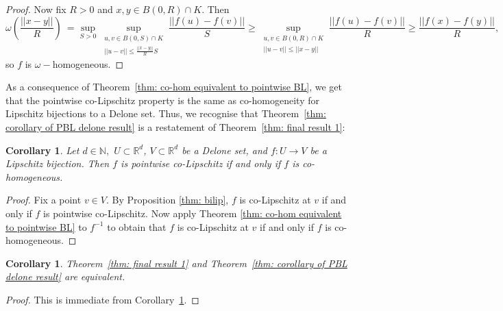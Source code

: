 \documentclass{article}
\newtheorem{cor}[define]{Corollary}
\newcommand{\R}{\mathbb{R}}
\newcommand{\N}{\mathbb{N}}
\begin{document}
\begin{proof}
   Now fix $R>0$ and $x,y \in B(0,R)\cap K.$ Then
    \begin{equation*}
        \omega\left(\frac{||x-y||}{R}\right) \ = \sup_{S>0} \sup_{\substack{u,v \in B(0,S)\cap K\\||u-v|| \leq \frac{||x-y||}{R}S}} \frac{||f(u)-f(v)||}{S} \geq \sup_{\substack{u,v \in B(0,R)\cap K\\||u-v|| \leq ||x-y||}} \frac{||f(u)-f(v)||}{R}\geq \frac{||f(x)-f(y)||}{R},
    \end{equation*} so $f$ is $\omega-$homogeneous.
\end{proof}
As a consequence of Theorem~\ref{thm: co-hom equivalent to pointwise BL}, we get that the pointwise co-Lipschitz property is the same as co-homogeneity for Lipschitz bijections to a Delone set. Thus, we recognise that Theorem~\ref{thm: corollary of PBL delone result} is a restatement of Theorem~\ref{thm: final result 1}:
\begin{cor} \label{cor: cohom equivalence}
    Let $d \in \N,$ $U \subset \R^d$, $V \subset \R^d$ be a Delone set, and $f:U \to V$ be a Lipschitz bijection. Then $f$ is pointwise co-Lipschitz if and only if $f$ is co-homogeneous. 
\end{cor}
\begin{proof} Fix a point $v \in V.$ By Proposition \ref{thm: bilip}, $f$ is co-Lipschitz at $v$ if and only if $f$ is pointwise co-Lipschitz. Now apply Theorem \ref{thm: co-hom equivalent to pointwise BL} to $f^{-1}$ to obtain that $f$ is co-Lipschitz at $v$ if and only if $f$ is co-homogeneous.
\end{proof}

\begin{cor}\label{cor:two_theorems_the_same}
    Theorem~\ref{thm: final result 1} and Theorem~\ref{thm: corollary of PBL delone result} are equivalent.
\end{cor}
\begin{proof}
 This is immediate from Corollary~\ref{cor: cohom equivalence}.
\end{proof}
 
\end{document}
